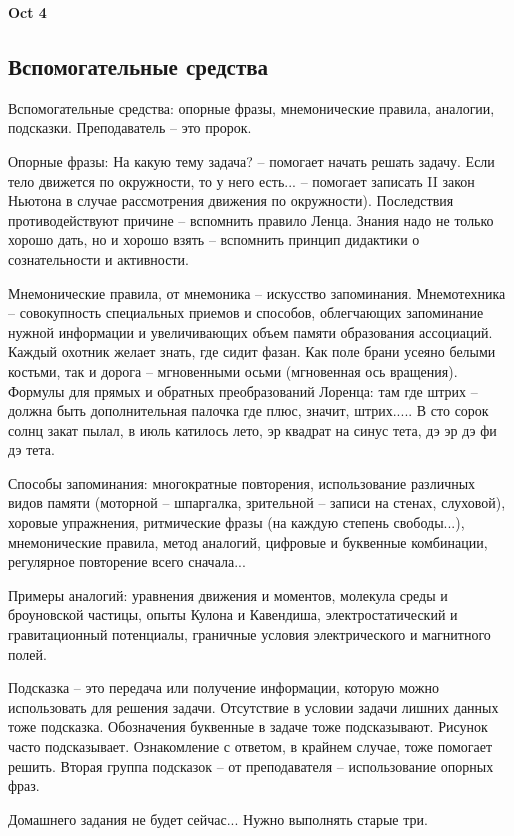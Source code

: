 \documentclass[a4paper, 12pt]{article}
\begin{document}
\hfill \textbf{Oct 4}

\subsection{Вспомогательные средства}

Вспомогательные средства: опорные фразы, мнемонические правила, 
аналогии, подсказки. Преподаватель -- это пророк.

Опорные фразы: На какую тему задача? -- помогает начать решать задачу. 
Если тело движется по окружности, то у него есть... -- помогает записать 
II закон Ньютона в случае рассмотрения движения по окружности). 
Последствия противодействуют причине -- вспомнить правило Ленца. Знания 
надо не только хорошо дать, но и хорошо взять -- вспомнить принцип 
дидактики о сознательности и активности.

Мнемонические правила, от мнемоника -- искусство запоминания. 
Мнемотехника -- совокупность специальных приемов и способов, облегчающих 
запоминание нужной информации и увеличивающих объем памяти образования 
ассоциаций. Каждый охотник желает знать, где сидит фазан. Как поле брани 
усеяно белыми костьми, так и дорога -- мгновенными осьми (мгновенная ось 
вращения). Формулы для прямых и обратных преобразований Лоренца: там где 
штрих -- должна быть дополнительная палочка где плюс, значит, штрих..... 
В сто сорок солнц закат пылал, в июль катилось лето, эр квадрат на синус 
тета, дэ эр дэ фи дэ тета.

Способы запоминания: многократные повторения, использование различных 
видов памяти (моторной -- шпаргалка, зрительной -- записи на стенах, 
слуховой), хоровые упражнения, ритмические фразы (на каждую степень 
свободы...), мнемонические правила, метод аналогий, цифровые и буквенные 
комбинации, регулярное повторение всего сначала...

Примеры аналогий: уравнения движения и моментов, молекула среды 
и броуновской частицы, опыты Кулона и Кавендиша, электростатический 
и гравитационный потенциалы, граничные условия электрического 
и магнитного полей.

Подсказка -- это передача или получение информации, которую можно 
использовать для решения задачи. Отсутствие в условии задачи лишних 
данных тоже подсказка. Обозначения буквенные в задаче тоже подсказывают. 
Рисунок часто подсказывает. Ознакомление с ответом, в крайнем случае, 
тоже помогает решить. Вторая группа подсказок -- от преподавателя -- 
использование опорных фраз.

Домашнего задания не будет сейчас... Нужно выполнять старые три.
\end{document}
